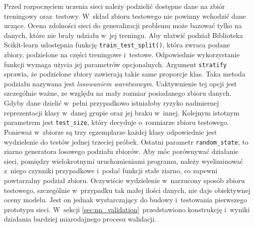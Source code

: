 Przed rozpoczęciem uczenia sieci należy podzielić dostępne dane na zbiór
treningowy oraz~testowy.
W~skład zbioru testowego nie powinny wchodzić dane uczące.
Ocena zdolności sieci do generalizacji problemu może bazować tylko na danych,
które nie brały udziału w~jej treningu.
Aby ułatwić podział Biblioteka Scikit-learn udostępnia funkcję
\texttt{train_test_split()}, która zwraca podane zbiory, podzielone
na części treningowe i~testowe.
Odpowiednie wykorzystanie funkcji wymaga użycia jej parametrów opcjonalnych.
Argument \texttt{stratify} sprawia, że podzielone zbiory zawierają
takie same proporcje klas.
Taka metoda podziału nazywana jest \emph{losowaniem warstwowym}.
Uaktywnienie tej opcji jest szczególnie ważne, ze względu na mały rozmiar
posiadanego zbioru danych.
Gdyby dane dzielić w~pełni przypadkowo istniałoby ryzyko nadmiernej
reprezentacji klasy w~danej grupie oraz jej braku w~innej.
Kolejnym istotnym parametrem jest \texttt{test_size}, który decyduje
o~rozmiarze zbioru testowego.
Ponieważ w~zbiorze są trzy egzemplarze każdej klasy odpowiednie jest wydzielenie
do testów jednej trzeciej próbek.
Ostatni parametr \texttt{random_state}, to ziarno generatora
losowego podziału zbiorów.
Aby móc porównywać działanie sieci, pomiędzy wielokrotnymi uruchomieniami
programu, należy wyeliminować z~niego czynniki przypadkowe i~podać funkcji stałe
ziarno, co zapewni powtarzalny podział zbioru.
Oczywiście wydzielenie w~narzucony sposób zbioru testowego, szczególnie
w~przypadku tak małej ilości danych, nie daje obiektywnej oceny modelu.
Jest on jednak wystarczający do budowy i~testowania pierwszego prototypu sieci.
W~sekcji \ref{sec:nn_validation}~przedstawiono konstrukcję i~wyniki działania
bardziej miarodajnego procesu walidacji.

